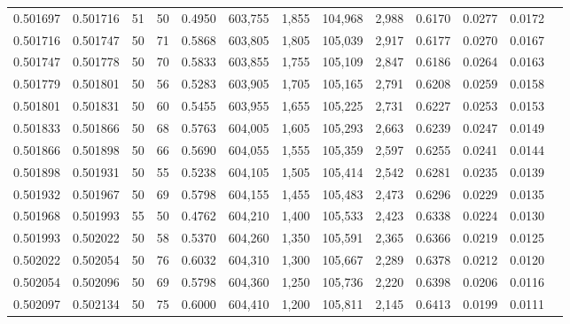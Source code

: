 \begin{tabular}{rrrrrrrrrrrrr}
0.501697 & 0.501716 &    51 &  50 &                                     0.4950 & 603,755 &   1,855 & 104,968 &   2,988 & 0.6170 & 0.0277 & 0.0172 \\
0.501716 & 0.501747 &    50 &  71 &                                     0.5868 & 603,805 &   1,805 & 105,039 &   2,917 & 0.6177 & 0.0270 & 0.0167 \\
0.501747 & 0.501778 &    50 &  70 &                                     0.5833 & 603,855 &   1,755 & 105,109 &   2,847 & 0.6186 & 0.0264 & 0.0163 \\
0.501779 & 0.501801 &    50 &  56 &                                     0.5283 & 603,905 &   1,705 & 105,165 &   2,791 & 0.6208 & 0.0259 & 0.0158 \\
0.501801 & 0.501831 &    50 &  60 &                                     0.5455 & 603,955 &   1,655 & 105,225 &   2,731 & 0.6227 & 0.0253 & 0.0153 \\
0.501833 & 0.501866 &    50 &  68 &                                     0.5763 & 604,005 &   1,605 & 105,293 &   2,663 & 0.6239 & 0.0247 & 0.0149 \\
0.501866 & 0.501898 &    50 &  66 &                                     0.5690 & 604,055 &   1,555 & 105,359 &   2,597 & 0.6255 & 0.0241 & 0.0144 \\
0.501898 & 0.501931 &    50 &  55 &                                     0.5238 & 604,105 &   1,505 & 105,414 &   2,542 & 0.6281 & 0.0235 & 0.0139 \\
0.501932 & 0.501967 &    50 &  69 &                                     0.5798 & 604,155 &   1,455 & 105,483 &   2,473 & 0.6296 & 0.0229 & 0.0135 \\
0.501968 & 0.501993 &    55 &  50 &                                     0.4762 & 604,210 &   1,400 & 105,533 &   2,423 & 0.6338 & 0.0224 & 0.0130 \\
0.501993 & 0.502022 &    50 &  58 &                                     0.5370 & 604,260 &   1,350 & 105,591 &   2,365 & 0.6366 & 0.0219 & 0.0125 \\
0.502022 & 0.502054 &    50 &  76 &                                     0.6032 & 604,310 &   1,300 & 105,667 &   2,289 & 0.6378 & 0.0212 & 0.0120 \\
0.502054 & 0.502096 &    50 &  69 &                                     0.5798 & 604,360 &   1,250 & 105,736 &   2,220 & 0.6398 & 0.0206 & 0.0116 \\
0.502097 & 0.502134 &    50 &  75 &                                     0.6000 & 604,410 &   1,200 & 105,811 &   2,145 & 0.6413 & 0.0199 & 0.0111 \\

\end{tabular}
